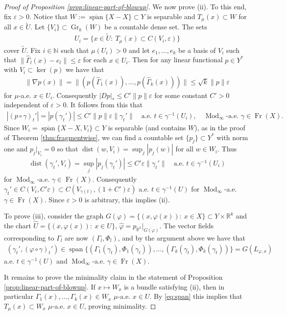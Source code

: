 \documentclass{amsart}
\numberwithin{equation}{section}
\newcommand{\R}{\mathbb{R}}
\newcommand{\N}{\mathbb{N}}
\newcommand{\Mod}{\operatorname{Mod}}
\newcommand{\dist}{\operatorname{dist}}
\newcommand{\Fr}{\operatorname{Fr}}
\newcommand{\inv}{^{-1}}
\begin{document}
\begin{proof}[Proof of Proposition \ref{prop:linear-part-of-blowup}]
We now prove (ii). To this end, fix $\varepsilon>0$. Notice that $W:=\overline{\operatorname{span}}\{X-X\}\subset Y$ is separable and $T_\mu(x)\subset W$ for all $x\in\widetilde U$. Let $\{V_i\}\subset \operatorname{Gr}_k(W)$ be a countable dense set. The sets
\begin{align*}
	U_i=\{x\in \widetilde U: \ T_\mu(x)\subset C(V_i,\varepsilon) \}
\end{align*}
cover $\widetilde U$.  Fix $i\in\N$ such that $\mu(U_i)>0$ and let $e_1,\ldots,e_k$ be a basis of $V_i$ such that $\|\widehat\Gamma_l(x)-e_l\|\le \varepsilon$ for each $x\in U_i$. Then for any linear functional $p\in Y^*$ with $V_i\subset \ker(p)$ we have that 
\begin{align*}
	\|\nabla p(x)\|=\|(p(\widehat\Gamma_1(x)),\ldots,p(\widehat\Gamma_k(x)))\|\le \sqrt k\|p\| \varepsilon
\end{align*}
for $\mu$-a.e. $x\in U_i$. Consequently $|Dp|_\ast\le C'\|p\|\varepsilon$ for some constant $C'>0$ independent of $\varepsilon>0$. It follows from this that 
\begin{align*}
	|(p\circ\gamma)_t'|=|p(\gamma_t')|\le C'\|p\|\varepsilon\|\gamma_t'\|\quad\textrm{a.e. }t\in \gamma\inv(U_i),\quad\Mod_\infty\textrm{-a.e. }\gamma\in \Fr(X).
\end{align*}
Since $W_i=\overline{\operatorname{span}}\{X-X,V_i\}\subset Y$ is separable (and contains $W$), as in the proof of Theorem \ref{thm:fragmentwise}, we can find a countable set $\{p_j\}\subset Y^*$ with norm one and $p_j|_{V_i}=0$ so that $\dist (w,V_i)=\sup_j|p_j(w)|$ for all $w\in W_i$. Thus 
\begin{align*}
\dist(\gamma_t',V_i)=\sup_j|p_j(\gamma_t')|\le C'\varepsilon\|\gamma_t'\|\quad\textrm{a.e. }t\in \gamma\inv(U_i)
\end{align*}
for $\Mod_\infty\textrm{-a.e. }\gamma\in \Fr(X).$ Consequently $\gamma_t'\in C(V_i,C'\varepsilon)\subset C(V_{\gamma(t)},(1+C')\varepsilon)$ a.e. $t\in \gamma\inv(U)$ for $\Mod_\infty$-a.e. $\gamma\in\Fr(X)$. Since $\varepsilon>0$ is arbitrary, this implies (ii).

To prove (iii), consider the graph $G(\varphi)=\{(x,\varphi(x)):\ x\in X\}\subset Y\times\R^k$ and the chart $\widehat U=\{(x,\varphi(x)):\ x\in U\}$, $\hat\varphi=p_{\R^k}|_{G(\varphi)}$. The vector fields corresponding to $\Gamma_l$ are now $(\Gamma_l,\Phi_l)$, and by the argument above we have that 
\begin{align*}
(\gamma_t',(\varphi\circ\gamma)_t')\in \operatorname{span}\{(\Gamma_1(\gamma_t),\Phi_1(\gamma_t)),\ldots, (\Gamma_k(\gamma_t),\Phi_k(\gamma_t)) \}=G(L_{\varphi,x})
\end{align*}
a.e. $t\in \gamma\inv(U)$ and $\Mod_\infty$-a.e. $\gamma\in\Fr(X)$.  

It remains to prove the minimality claim in the statement of Proposition \ref{prop:linear-part-of-blowup}. If $x\mapsto W_x$ is a bundle satisfying (ii), then in particular $\Gamma_1(x),\ldots,\Gamma_k(x)\in W_x$ $\mu$-a.e. $x\in U$. By \eqref{eq:span} this implies that $T_\mu(x)\subset W_x$ $\mu$-a.e. $x\in U$, proving minimality.
\end{proof}
 
\end{document}
